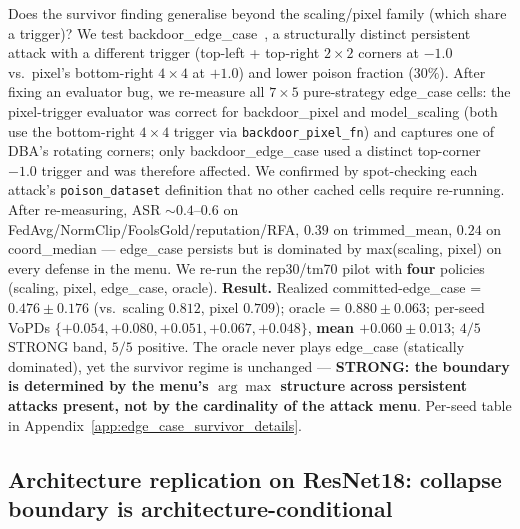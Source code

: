 \documentclass{article}
\begin{document}
Does the survivor finding generalise beyond the scaling/pixel family (which share a trigger)? We test backdoor\_edge\_case~\citep{wang2020attack}, a structurally distinct persistent attack with a different trigger (top-left + top-right $2\times 2$ corners at $-1.0$ vs.\ pixel's bottom-right $4\times 4$ at $+1.0$) and lower poison fraction ($30\%$). After fixing an evaluator bug, we re-measure all $7\times 5$ pure-strategy edge\_case cells: the pixel-trigger evaluator was correct for backdoor\_pixel and model\_scaling (both use the bottom-right $4{\times}4$ trigger via \texttt{backdoor\_pixel\_fn}) and captures one of DBA's rotating corners; only backdoor\_edge\_case used a distinct top-corner $-1.0$ trigger and was therefore affected. We confirmed by spot-checking each attack's \texttt{poison\_dataset} definition that no other cached cells require re-running. After re-measuring, ASR $\sim 0.4$--$0.6$ on FedAvg/NormClip/FoolsGold/reputation/RFA, $0.39$ on trimmed\_mean, $0.24$ on coord\_median --- edge\_case persists but is dominated by max(scaling, pixel) on every defense in the menu. We re-run the rep30/tm70 pilot with \textbf{four} policies (scaling, pixel, edge\_case, oracle). \textbf{Result.} Realized committed-edge\_case = $0.476 \pm 0.176$ (vs.\ scaling $0.812$, pixel $0.709$); oracle = $\mathbf{0.880 \pm 0.063}$; per-seed VoPDs $\{+0.054, +0.080, +0.051, +0.067, +0.048\}$, \textbf{mean $+0.060 \pm 0.013$}; $4/5$ STRONG band, $5/5$ positive. The oracle never plays edge\_case (statically dominated), yet the survivor regime is unchanged --- \textbf{STRONG: the boundary is determined by the menu's $\arg\max$ structure across persistent attacks present, not by the cardinality of the attack menu}. Per-seed table in Appendix~\ref{app:edge_case_survivor_details}.

\subsection{Architecture replication on ResNet18: collapse boundary is architecture-conditional}
\label{sec:resnet18_replication}
\end{document}
